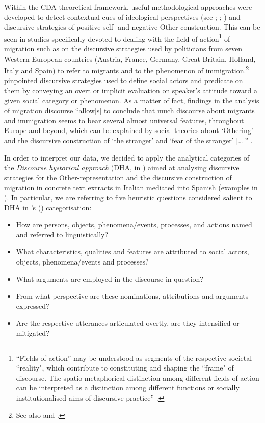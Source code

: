 \documentclass[output=paper]{langscibook}
\begin{document}
Within the CDA theoretical framework, useful methodological approaches were developed to detect contextual cues of ideological perspectives (see \citealt{Wodak1996,Wodak2001}; \citealt{ReisiglWodak2001}; \citealt{VanDijk1995, VanDijk2006ideology, VanDijk2015}) and discursive strategies of positive self- and negative Other construction. This can be seen in studies specifically devoted to dealing with the field of action\footnote{``Fields of action'' may be understood as segments of the respective societal ``reality", which contribute to constituting and shaping the ``frame" of discourse. The spatio-metaphorical distinction among different fields of action can be interpreted as a distinction among different functions or socially institutionalised aims of discursive practice” \citep[36]{ReisiglWodak2001}.} of migration such as \citet{WodakVanDijk2000} on the discursive strategies used by politicians from seven Western European countries (Austria, France, Germany, Great Britain, Holland, Italy and Spain) to refer to migrants and to the phenomenon of immigration.\footnote{See also \citet{RojoVanDijk1997} and \citet{BeatonThome2013}.} \citet{ReisiglWodak2001} pinpointed discursive strategies used to define social actors and predicate on them by conveying an overt or implicit evaluation on speaker’s attitude toward a given social category or phenomenon. As a matter of fact, findings in the analysis of migration discourse “allow[s] to conclude that much discourse about migrants and immigration seems to bear several almost universal features, throughout Europe and beyond, which can be explained by social theories about ‘Othering’ and the discursive construction of ‘the stranger’ and ‘fear of the stranger’ [\ldots]” \citep[8]{Wodak2015}.

In order to interpret our data, we decided to apply the analytical categories of the \textit{Discourse hystorical approach} (DHA, in \citealt{ReisiglWodak2009}) aimed at analysing discursive strategies for the Other-representation and the discursive construction of migration in concrete text extracts in Italian mediated into Spanish (examples in ). In particular, we are referring to five heuristic questions considered salient to DHA in \citeauthor{Wodak2015}'s (\citeyear[8]{Wodak2015}) categorisation:

\begin{itemize}\sloppy
\item How are persons, objects, phenomena/events, processes, and actions named and referred to linguistically? 
\item What characteristics, qualities and features are attributed to social actors, objects, phenomena/events and processes? 
\item What arguments are employed in the discourse in question? 
\item From what perspective are these nominations, attributions and arguments expressed?
\item Are the respective utterances articulated overtly, are they intensified or mitigated?
\end{itemize}
\end{document}
